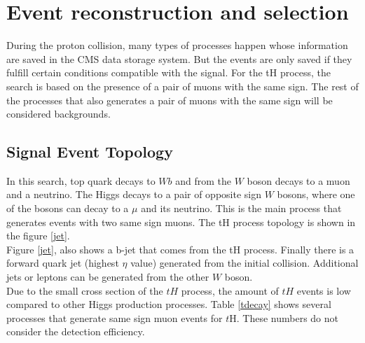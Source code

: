 \chapter{Event reconstruction and selection}
During the proton collision, many types of processes happen whose information are saved in the CMS data storage system. But the events are only saved if they fulfill certain conditions compatible with the signal. 
For the tH process, the search is based on the presence of a pair of muons with the same sign. The rest of the processes that also generates a pair of muons with the same sign will be considered backgrounds. 
\section{Signal Event Topology} 
In this search, top quark decays to $Wb$ and from the $W$ boson decays to a muon and a neutrino. The Higgs decays to a pair of opposite sign $W$ bosons, where one of the bosons can decay to a $\mu$ and its neutrino. This is the main process that generates events with two same sign muons. The tH process topology is shown in the figure \ref{jet}.\\

Figure \ref{jet}, also shows a b-jet that comes from the tH process. Finally there is a forward quark jet (highest $\eta$ value) generated from the initial collision. Additional jets or leptons can be generated from the other $W$ boson.
\\
	
Due to the small cross section of the $tH$ process, the amount of $tH$ events is low compared to other Higgs production processes. 
Table \ref{tdecay} shows several processes that generate same sign muon events for $t$H. These numbers do not consider the detection efficiency.


